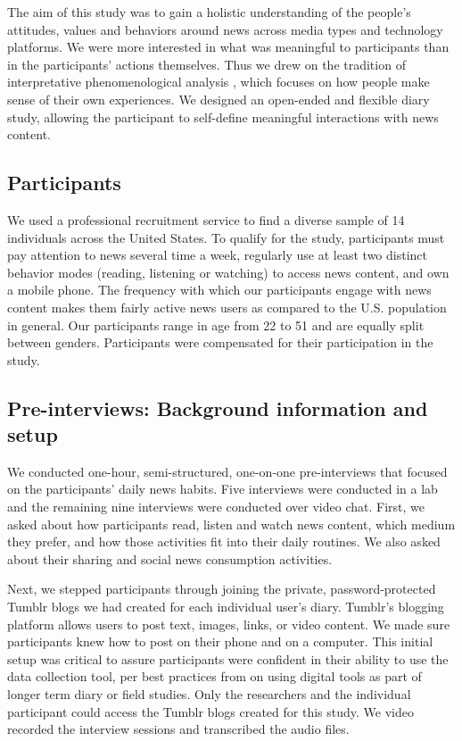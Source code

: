 \documentclass[sigchi]{acmart}
\begin{document}
The aim of this study was to gain a holistic understanding of the people's attitudes, values and behaviors around news across media types and technology platforms. We were more interested in what was meaningful to participants than in the participants’ actions themselves. Thus we drew on the tradition of interpretative phenomenological analysis \cite{smith_flowers_larkin_2013}, which focuses on how people make sense of their own experiences. We designed an open-ended and flexible diary study, allowing the participant to self-define meaningful interactions with news content.

\subsection{Participants}
We used a professional recruitment service to find a diverse sample of 14 individuals across the United States. To qualify for the study, participants must pay attention to news several time a week, regularly use at least two distinct behavior modes (reading, listening or watching) to access news content, and own a mobile phone. The frequency with which our participants engage with news content makes them fairly active news users as compared to the U.S. population in general\cite{pew_online2017}. Our participants range in age from 22 to 51 and are equally split between genders. Participants were compensated for their participation in the study.

\subsection{Pre-interviews: Background information and setup}
We conducted one-hour, semi-structured, one-on-one pre-interviews that focused on the participants’ daily news habits. Five interviews were conducted in a lab and the remaining nine interviews were conducted over video chat. First, we asked about how participants read, listen and watch news content, which medium they prefer, and how those activities fit into their daily routines. We also asked about their sharing and social news consumption activities.

Next, we stepped participants through joining the private, password-protected Tumblr blogs we had created for each individual user's diary. Tumblr's blogging platform allows users to post text, images, links, or video content.  We made sure participants knew how to post on their phone and on a computer. This initial setup was critical to assure participants were confident in their ability to use the data collection tool, per best practices from on using digital tools as part of longer term diary or field studies\cite{consolvo_2017}. Only the researchers and the individual participant could access the Tumblr blogs created for this study. We video recorded the interview sessions and transcribed the audio files. 
\end{document}
